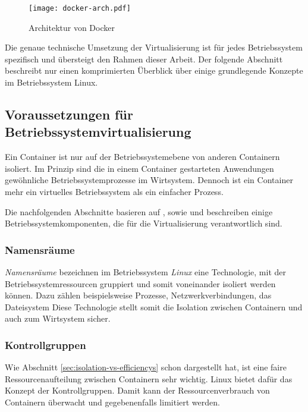 \begin{figure}[!hbt]%
\centering
\texttt{[image: docker-arch.pdf]}%
\caption{Architektur von Docker}%
\label{fig:docker-arch}%
\end{figure}

Die genaue technische Umsetzung der Virtualisierung ist für jedes Betriebssystem spezifisch und übersteigt den Rahmen dieser Arbeit. Der folgende Abschnitt beschreibt nur einen komprimierten Überblick über einige grundlegende Konzepte im Betriebssystem Linux.

\subsection{Voraussetzungen für Betriebssystemvirtualisierung}
\label{subsec:docker-tech}

Ein Container ist nur auf der Betriebssystemebene von anderen Containern isoliert. Im Prinzip sind die in einem Container gestarteten Anwendungen  gewöhnliche Betriebssystemprozesse im Wirtsystem. Dennoch ist ein Container mehr ein virtuelles Betriebssystem als ein einfacher Prozess.

Die nachfolgenden Abschnitte basieren auf \cite{Merkel:2014:DLL:2600239.2600241}, sowie \cite{DBLP:journals/corr/Bui15} und beschreiben einige Betriebssystemkomponenten, die für die Virtualisierung verantwortlich sind.

\subsubsection{Namensräume}

\textit{Namensräume} bezeichnen im Betriebssystem \textit{Linux} eine Technologie, mit der Betriebssystemressourcen gruppiert und somit voneinander isoliert werden können. Dazu zählen beispielsweise Prozesse, Netzwerkverbindungen, das Dateisystem \usw Diese Technologie stellt somit die Isolation zwischen Containern und auch zum Wirtsystem sicher.

\subsubsection{Kontrollgruppen}

Wie Abschnitt \ref{sec:isolation-vs-efficiencys} schon dargestellt hat, ist eine faire Ressourcenaufteilung zwischen Containern sehr wichtig. Linux bietet dafür das Konzept der Kontrollgruppen. Damit kann der Ressourcenverbrauch von Containern überwacht und gegebenenfalls limitiert werden.

